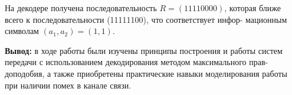 \documentclass[14pt]{article}
\begin{document}
На декодере получена последовательность $R = (11110000)$, которая ближе всего к последовательности (11111100), что соответствует инфор- мационным символам $(a_{1}, a_{2}) = (1, 1)$. 

\textbf{Вывод:} в ходе работы были изучены принципы построения и работы систем передачи с использованием декодирования методом максимального прав- доподобия, а также приобретены практические навыки моделирования работы при наличии помех в канале связи.
\end{document}
